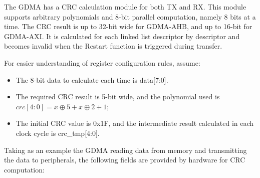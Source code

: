 \documentclass[main\_\_EN.tex]{subfiles}
\begin{document}
The GDMA has a CRC calculation module for both TX and RX. This module supports arbitrary polynomials and 8-bit parallel computation, namely 8 bits at a time. The CRC result is up to 32-bit wide for GDMA-AHB, and up to 16-bit for GDMA-AXI. It is calculated for each linked list descriptor by descriptor and becomes invalid when the Restart function is triggered during transfer.

For easier understanding of register configuration rules, assume:
\begin{itemize}
    \item The 8-bit data to calculate each time is data[7:0].
    \item The required CRC result is 5-bit wide, and the polynomial used is \(crc[4:0] = x \oplus 5+ x \oplus 2 +1\);
    \item The initial CRC value is 0x1F, and the intermediate result calculated in each clock cycle is crc\_tmp[4:0].
\end{itemize}

Taking as an example the GDMA reading data from memory and transmitting the data to peripherals, the following fields are provided by hardware for CRC computation:
\end{document}
